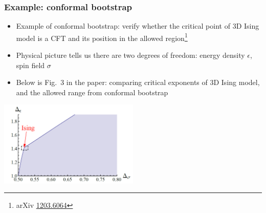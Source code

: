 \documentclass{beamer}
\begin{document}
\begin{frame}
\frametitle{Example: conformal bootstrap}

\begin{itemize}
    \item Example of conformal bootstrap: verify whether the critical point of 3D Ising model 
    is a CFT and its position in the allowed region\footnote{arXiv \href{https://arxiv.org/abs/1203.6064}{1203.6064}}
    \item Physical picture tells us there are two degrees of freedom: energy density $\epsilon$, spin field $\sigma$
    \item Below is Fig.~3 in the paper: comparing critical exponents of 3D Ising model, and the allowed range from conformal bootstrap
\end{itemize}

\begin{center}
    \includegraphics[width=0.5\textwidth]{3d-ising-cft-bootstrap-range.PNG}
\end{center}

\end{frame}
\end{document}

